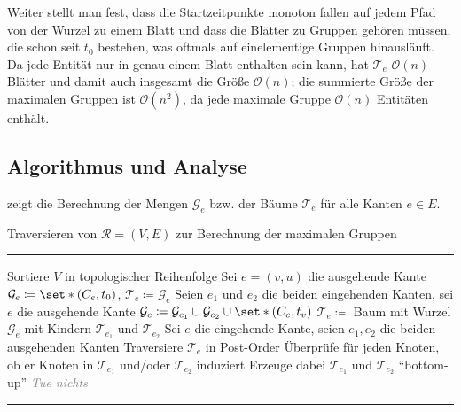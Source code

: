 Weiter stellt man fest, dass die Startzeitpunkte monoton fallen auf jedem Pfad von der Wurzel zu einem Blatt und dass die Blätter zu Gruppen gehören müssen, die schon seit $t_0$ bestehen, was oftmals auf einelementige Gruppen hinausläuft.
Da jede Entität nur in genau einem Blatt enthalten sein kann, hat $\mathcal{T}_e$ $\mathcal{O}(n)$ Blätter und damit auch insgesamt die Größe $\mathcal{O}(n)$; die summierte Größe der maximalen Gruppen ist $\mathcal{O}(n^2)$, da jede maximale Gruppe $\mathcal{O}(n)$ Entitäten enthält.

\subsection{Algorithmus und Analyse} %
\label{sub:algorithmus_und_analyse}
 zeigt die Berechnung der Mengen $\mathcal{G}_e$ bzw. der Bäume $\mathcal{T}_e$ für alle Kanten $e \in E$.
\begin{algorithm}[hbtp]
	\caption{Traversieren von $\mathcal{R}=(V,E)$ zur Berechnung der maximalen Gruppen}\label{alg:max_groups}
	\vspace{.5em}
	\hrule\vspace{.5em}
	
	\begin{algorithmic}
		\State Sortiere $V$ in topologischer Reihenfolge
			\State Sei $e=(v,u)$ die ausgehende Kante
			\State $\mathcal{G}_e \coloneqq \set*{(C_e,t_0)}$, $\mathcal{T}_e \coloneqq \mathcal{G}_e$
			\State Seien $e_1$ und $e_2$ die beiden eingehenden Kanten, sei $e$ die ausgehende Kante
			\State $\mathcal{G}_e \coloneqq \mathcal{G}_{e_1} \cup \mathcal{G}_{e_2} \cup \set*{(C_e,t_v)}$
			\State $\mathcal{T}_e \coloneqq$ Baum mit Wurzel $\mathcal{G}_e$ mit Kindern $\mathcal{T}_{e_1}$ und $\mathcal{T}_{e_2}$
			\State Sei $e$ die eingehende Kante, seien $e_1,e_2$ die beiden ausgehenden Kanten
			\State Traversiere $\mathcal{T}_e$ in Post-Order
			\State Überprüfe für jeden Knoten, ob er Knoten in $\mathcal{T}_{e_1}$ und/oder $\mathcal{T}_{e_2}$ induziert
			\State Erzeuge dabei $\mathcal{T}_{e_1}$ und $\mathcal{T}_{e_2}$ \enquote{bottom-up}
			\State \textcolor{gray}{\emph{Tue nichts}}
			\EndIf
		\EndFor
		\EndProcedure
	\end{algorithmic}
	\hrule
\end{algorithm}

